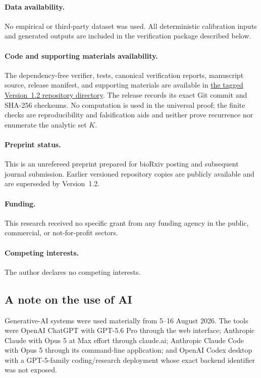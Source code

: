 \paragraph{Data availability.}
No empirical or third-party dataset was used.  All deterministic calibration
inputs and generated outputs are included in the verification package
described below.

\paragraph{Code and supporting materials availability.}
The dependency-free verifier, tests, canonical verification reports,
manuscript source, release manifest, and supporting materials are available in
\href{https://github.com/AlecKriebel/Math/tree/bimolecular-positive-recurrence-v1.2/bimolecular_positive_recurrence_submission_v1_2}{the tagged Version~1.2 repository directory}.
The release records its exact Git commit and SHA-256 checksums.  No computation
is used in the universal proof; the finite checks are reproducibility and
falsification aids and neither prove recurrence nor enumerate the analytic set
\(K\).

\paragraph{Preprint status.}
This is an unrefereed preprint prepared for bioRxiv posting and subsequent
journal submission.  Earlier versioned repository copies are publicly
available and are superseded by Version~1.2.

\paragraph{Funding.}
This research received no specific grant from any funding agency in the public,
commercial, or not-for-profit sectors.

\paragraph{Competing interests.}
The author declares no competing interests.

\subsection*{A note on the use of AI}
Generative-AI systems were used materially from 5--16 August 2026.  The tools
were OpenAI ChatGPT with GPT-5.6 Pro through the web interface; Anthropic
Claude with Opus 5 at Max effort through claude.ai; Anthropic Claude Code with
Opus 5 through its command-line application; and OpenAI Codex desktop with a
GPT-5-family coding/research deployment whose exact backend identifier was not
exposed.


